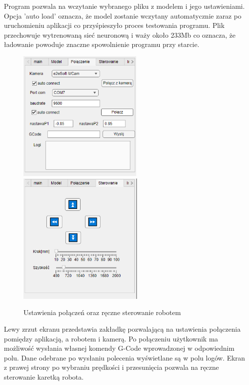 Program pozwala na wczytanie wybranego pliku z modelem i jego ustawieniami. Opcja 'auto load' oznacza,
że model zostanie wczytany automatycznie zaraz po uruchomieniu aplikacji co przyśpieszyło proces testowania programu. 
Plik przechowuje wytrenowaną sieć neuronową i waży około 233Mb co oznacza, że ładowanie powoduje znaczne spowolnienie programu przy starcie.
\begin{figure}[H]
	\centering
	\includegraphics[height=6.5cm]{pages/siecIRobot/zdjecia/program/programUstPolaczenie.png}
	\includegraphics[height=6.5cm]{pages/siecIRobot/zdjecia/program/programUstSterowanie.png}
	\caption{Ustawienia połączeń oraz ręczne sterowanie robotem}
\end{figure}
Lewy zrzut ekranu przedstawia zakładkę pozwalającą na ustawienia połączenia pomiędzy aplikacją, a robotem i kamerą. 
Po połączeniu użytkownik ma możliwość wysłania własnej komendy G-Code wprowadzonej w odpowiednim polu. 
Dane odebrane po wysłaniu polecenia wyświetlane są w polu logów. Ekran z prawej strony po wybraniu prędkości i przesunięcia
pozwala na ręczne sterowanie karetką robota.
